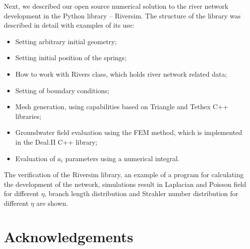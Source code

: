 \documentclass[]{pracamgr}
\begin{document}
    Next, we described our open source numerical solution to the river network development in the Python library -- Riversim. The structure of the library was described in detail with examples of its use: 
    
    \begin{itemize}
      \item Setting arbitrary initial geometry;
      \item Setting initial position of the springs;
      \item How to work with Rivers class, which holds river network related data;
      \item Setting of boundary conditions;
      \item Mesh generation, using capabilities based on Triangle and Tethex C++ libraries;
      \item Groundwater field evaluation using the FEM method, which is implemented in the Deal.II C++ library;
      \item Evaluation of $a_i$ parameters using a numerical integral.
    \end{itemize}

    The verification of the Riversim library, an example of a program for calculating the development of the network, simulations result in Laplacian and Poisson field for different $\eta$, branch length distribution and Strahler number distribution for different $\eta$ are shown.\par

    \section*{Acknowledgements}
      
\end{document}
